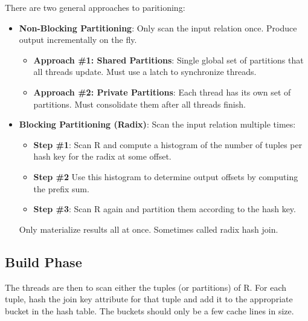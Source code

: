 \documentclass[11pt]{article}
\begin{document}
There are two general approaches to paritioning:
\begin{itemize}
	\item \textbf{Non-Blocking Partitioning}: 
	Only scan the input relation once.
	Produce output incrementally on the fly.
	\begin{itemize}
		\item \textbf{Approach \#1: Shared Partitions}: 
		Single global set of partitions that all threads update.
		Must use a latch to synchronize threads.
		
		\item \textbf{Approach \#2: Private Partitions}: 
		Each thread has its own set of partitions.
		Must consolidate them after all threads finish.
	\end{itemize}
	
	\item \textbf{Blocking Partitioning (Radix)}: 
	Scan the input relation multiple times:
	\begin{itemize}
		\item \textbf{Step \#1}:
		Scan R and compute a histogram of the number of tuples per hash key for the radix at some offset.
		
		\item \textbf{Step \#2}
		Use this histogram to determine output offsets by computing the prefix sum.
		
		\item \textbf{Step \#3}:
		Scan R again and partition them according to the hash key.
	\end{itemize}

	Only materialize results all at once.
	Sometimes called radix hash join.

\end{itemize}

\subsection*{Build Phase}
The threads are then to scan either the tuples (or partitions) of R. For each tuple, hash the join key attribute for that tuple and add it to the appropriate bucket in the hash table. The buckets should only be a few cache lines in size.
\end{document}
